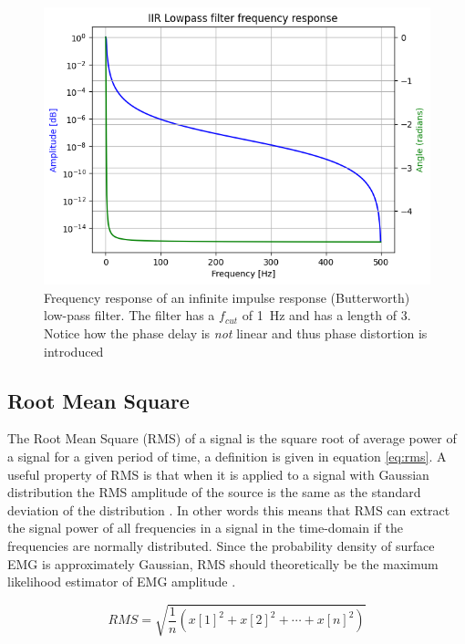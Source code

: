 \begin{figure}[h!t]
	\begin{center}
		\includegraphics[width=0.7\columnwidth]{images/iirfilter_phaseshift.png}
	\end{center}
	\caption{Frequency response of an infinite impulse response (Butterworth) low-pass filter. The filter has a $f_{cut}$ of \SI{1}{Hz} and has a length of 3. Notice how the phase delay is \textit{not} linear and thus phase distortion is introduced}
	\label{fig:iirfilter_phaseshift}
\end{figure}

\subsection{Root Mean Square}
The Root Mean Square (RMS) of a signal is the square root of average power of a signal for a given period of time, a definition is given in equation \ref{eq:rms}. A useful property of RMS is that when it is applied to a signal with Gaussian distribution the RMS amplitude of the source is the same as the standard deviation of the distribution \cite{rms_standard_deviation}. In other words this means that RMS can extract the signal power of all frequencies in a signal in the time-domain if the frequencies are normally distributed. Since the probability density of surface EMG is approximately Gaussian, RMS should theoretically be the maximum likelihood estimator of EMG amplitude \cite{semg_signals_analysis_and_applications}.

\begin{equation}
    RMS = \sqrt{\frac{1}{n} (x[1]^2 + x[2]^2 + \cdots + x[n]^2)}
    \label{eq:rms}
\end{equation}

